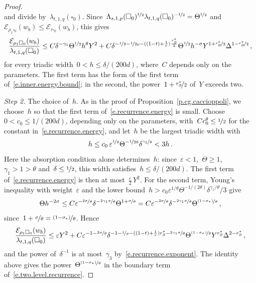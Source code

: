 \documentclass[11pt,letterpaper]{article}
\numberwithin{equation}{section}
\theoremstyle{definition}
\newcommand{\eps}{\varepsilon}
\newcommand{\nf}{\nicefrac}
\newcommand{\cu}{\square}
\newcommand{\Ener}{\mathcal E}
\begin{document}
\begin{proof}
\begin{equation*}
\end{equation*}
and divide by~$\lambda_{t,1,q}(\cu_0)$. Since~$\Lambda_{s,1,p}(\cu_0)^{\nf12}\lambda_{t,1,q}(\cu_0)^{-\nf12}=\Theta^{\nf12}$ and~$\Ener_{\rho_1\cu_0}(w_b)\leq\Ener_{\tau\cu_0}(w_b)$, this gives
\begin{equation}
	\frac{\Ener_{\rho_1\cu_0}(w_b)}{\lambda_{t,1,q}(\cu_0)}\leq C\delta^{-\gamma_1}\Theta^{\nf12}h^\theta Y^2+C\delta^{-\nf12-\nf1{2p}-((1-t)+\frac1r)\frac{r_\partial^*}2}\Theta^{\nf12}h^{-\sigma}Y^{1+\nf{r_\partial^*}2}\Delta^{1-\nf{r_\partial^*}2}\,,
	\label{e.recurrence.energy}
\end{equation}
for every triadic width~$0<h\leq\delta/(200d)$, where~$C$ depends only on the parameters. The first term has the form of the first term of~\eqref{e.inner.energy.bound}; in the second, the power~$1+\nf{r_\partial^*}2$ of~$Y$ exceeds two.

\smallskip

\emph{Step 2.} The choice of~$h$. As in the proof of Proposition~\ref{p.cg.caccioppoli}, we choose~$h$ so that the first term of~\eqref{e.recurrence.energy} is small. Choose~$0<c_0\leq1/(200d)$, depending only on the parameters, with~$Cc_0^\theta\leq\nf12$ for the constant in~\eqref{e.recurrence.energy}, and let~$h$ be the largest triadic width with
\begin{equation*}
	h\leq c_0\,\eps^{\nf1\theta}\Theta^{-\nf1{2\theta}}\delta^{\nf{\gamma_1}\theta}<3h\,.
\end{equation*}
Here the absorption condition alone determines~$h$: since~$\eps<1$,~$\Theta\geq1$,~$\gamma_1>1>\theta$ and~$\delta\leq\nf12$, this width satisfies~$h\leq\delta/(200d)$. The first term of~\eqref{e.recurrence.energy} is then at most~$\frac\eps2\,Y^2$. For the second term, Young's inequality with weight~$\eps$ and the lower bound~$h>c_0\eps^{1/\theta}\Theta^{-1/(2\theta)}\delta^{\gamma_1/\theta}/3$ give
\begin{equation*}
	\Theta h^{-2\sigma}\leq C\eps^{-\nf{2\sigma}\theta}\delta^{-\nf{2\gamma_1\sigma}\theta}\Theta^{1+\nf\sigma\theta}=C\eps^{-\nf{2\sigma}\theta}\delta^{-\nf{2\gamma_1\sigma}\theta}\Theta^{\nf{(1-\sigma_*)}\theta}\,,
\end{equation*}
since~$1+\nf\sigma\theta=\nf{(1-\sigma_*)}\theta$. Hence
\begin{equation*}
	\frac{\Ener_{\rho_1\cu_0}(w_b)}{\lambda_{t,1,q}(\cu_0)}\leq\eps Y^2+C\eps^{-1-\nf{2\sigma}\theta}\delta^{-1-\nf1p-((1-t)+\frac1r)r_\partial^*-\nf{2\gamma_1\sigma}\theta}\Theta^{\nf{(1-\sigma_*)}\theta}Y^{r_\partial^*}\Delta^{2-r_\partial^*}\,,
\end{equation*}
and the power of~$\delta^{-1}$ is at most~$\gamma_3$ by~\eqref{e.recurrence.exponent}. The identity above gives the power~$\Theta^{\nf{(1-\sigma_*)}\theta}$ in the boundary term of~\eqref{e.two.level.recurrence}.


\end{proof}
\end{document}
